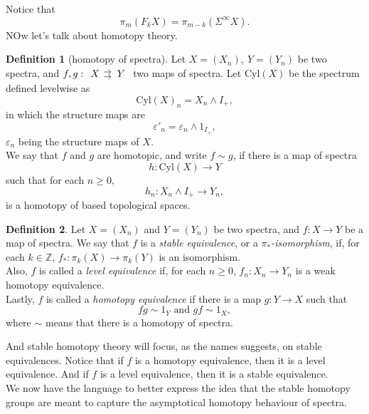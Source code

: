 \documentclass[a4paper,english,11pt]{article}
\theoremstyle{definition}
\newtheorem{Def}{Definition}
\theoremstyle{plain}
\theoremstyle{remark}
\newcommand{\Susp}{\Sigma^{\infty}}
\newcommand{\Cyl}{\text{Cyl}}
\newcommand{\struc}{\varepsilon}
\begin{document}
Notice that
\[\pi_m(F_kX)=\pi_{m-k}(\Susp X).\]
NOw let's talk about homotopy theory.
\begin{Def}[homotopy of spectra]
  Let \(X=(X_n),\ Y=(Y_n)\) be two spectra, and \(f,g:\begin{tikzcd}[column sep =0.9em] X\arrow[shift left=1, shorten >=1.5]{r}\arrow[shift right=1, shorten >=1.5]{r}& Y \end{tikzcd}\) two maps of spectra. Let \(\Cyl(X)\) be the spectrum defined levelwise as 
  \[\Cyl(X)_n=X_n\wedge I_{+},\]
  in which the structure maps are
  \[\struc'_n=\struc_n\wedge 1_{I_{+}},\]
  \(\struc_n\) being the structure maps of \(X\).\\

  We say that \(f\) and \(g\) are homotopic, and write \(f\sim g\), if there is a map of spectra
  \[h:\Cyl(X)\to Y\]
  such that for each \(n\geq 0\),
  \[h_n:X_n\wedge I_{+}\to Y_n,\]
  is a homotopy of based topological spaces.
\end{Def}
\begin{Def}
  Let \(X=(X_n)\) and \(Y=(Y_n)\) be two spectra, and \(f:X\to Y\) be a map of spectra. We say that \(f\) is a \textit{stable equivalence}, or a \textit{\(\pi_\ast\)-isomorphism}, if, for each \(k\in\mathbb{Z}\), \(f_*:\pi_k(X)\to\pi_k(Y)\) is an isomorphism.\\

  Also, \(f\) is called a \textit{level equivalence} if, for each \(n\geq 0\), \(f_n:X_n\to Y_n\) is a weak homotopy equivalence.\\
  
  Lastly, \(f\) is called a \textit{homotopy equivalence} if there is a map \(g:Y\to X\) such that
  \[fg\sim 1_Y \text{ and } gf\sim 1_X,\]
  where \(\sim\) means that there is a homotopy of spectra.
\end{Def}
And stable homotopy theory will focus, as the names suggests, on stable equivalences. 
Notice that if \(f\) is a homotopy equivalence, then it is a level equivalence. And if \(f\) is a level equivalence, then it is a stable equivalence.\\

We now have the language to better express the idea that the stable homotopy groups are meant to capture the asymptotical homotopy behaviour of spectra.
\end{document}
